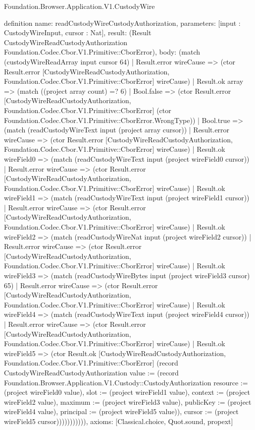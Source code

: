 \begin{lexlean}{Foundation.Browser.Application.V1.CustodyWire}
\begin{semanticmodule}
definition{
  name: readCustodyWireCustodyAuthorization,
  parameters: [input : CustodyWireInput, cursor : Nat],
  result: (Result CustodyWireReadCustodyAuthorization Foundation.Codec.Cbor.V1.Primitive::CborError),
  body: (match (custodyWireReadArray input cursor 64)
    | Result.error wireCause => (ctor Result.error [CustodyWireReadCustodyAuthorization, Foundation.Codec.Cbor.V1.Primitive::CborError] wireCause)
    | Result.ok array => (match ((project array count) =? 6)
      | Bool.false => (ctor Result.error [CustodyWireReadCustodyAuthorization, Foundation.Codec.Cbor.V1.Primitive::CborError] (ctor Foundation.Codec.Cbor.V1.Primitive::CborError.WrongType))
      | Bool.true => (match (readCustodyWireText input (project array cursor))
        | Result.error wireCause => (ctor Result.error [CustodyWireReadCustodyAuthorization, Foundation.Codec.Cbor.V1.Primitive::CborError] wireCause)
        | Result.ok wireField0 => (match (readCustodyWireText input (project wireField0 cursor))
          | Result.error wireCause => (ctor Result.error [CustodyWireReadCustodyAuthorization, Foundation.Codec.Cbor.V1.Primitive::CborError] wireCause)
          | Result.ok wireField1 => (match (readCustodyWireText input (project wireField1 cursor))
            | Result.error wireCause => (ctor Result.error [CustodyWireReadCustodyAuthorization, Foundation.Codec.Cbor.V1.Primitive::CborError] wireCause)
            | Result.ok wireField2 => (match (readCustodyWireNat input (project wireField2 cursor))
              | Result.error wireCause => (ctor Result.error [CustodyWireReadCustodyAuthorization, Foundation.Codec.Cbor.V1.Primitive::CborError] wireCause)
              | Result.ok wireField3 => (match (readCustodyWireBytes input (project wireField3 cursor) 65)
                | Result.error wireCause => (ctor Result.error [CustodyWireReadCustodyAuthorization, Foundation.Codec.Cbor.V1.Primitive::CborError] wireCause)
                | Result.ok wireField4 => (match (readCustodyWireText input (project wireField4 cursor))
                  | Result.error wireCause => (ctor Result.error [CustodyWireReadCustodyAuthorization, Foundation.Codec.Cbor.V1.Primitive::CborError] wireCause)
                  | Result.ok wireField5 => (ctor Result.ok [CustodyWireReadCustodyAuthorization, Foundation.Codec.Cbor.V1.Primitive::CborError] (record CustodyWireReadCustodyAuthorization {value := (record Foundation.Browser.Application.V1.Custody::CustodyAuthorization {resource := (project wireField0 value), slot := (project wireField1 value), context := (project wireField2 value), maximum := (project wireField3 value), publicKey := (project wireField4 value), principal := (project wireField5 value)}), cursor := (project wireField5 cursor)})))))))))),
  axioms: [Classical.choice, Quot.sound, propext]
}


\end{semanticmodule}
\end{lexlean}
